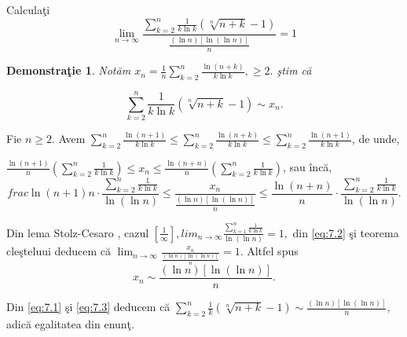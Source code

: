 \documentclass[a4paper,12pt,oneside]{report}
\newtheorem{demonstration}{Demonstra\c tie}
\begin{document}
Calcula\c ti 
\begin{displaymath}
  \lim_{n \to \infty }\frac{\sum_{k=2}^{n}\frac{1}{k \ln k}\left ( \sqrt[n]{n+k}-1 \right )}{\frac{\left ( \ln n \right )\left [ \ln \left ( \ln n  \right ) \right ]}{n}} = 1
\end{displaymath}


\begin{demonstration}
  Not\u am \(x_{n} = \frac{1}{n}\sum_{k=2}^{n}\frac{\ln \left ( n+k \right )}{k \ln k}, \geq 2.\)
\c stim c\u a 

\end{demonstration}
\begin{displaymath}
  \sum_{k=2}^{n}\frac{1}{k\ln k}\left ( \sqrt[n]{n+k}-1 \right )\sim x_{n} . \label{eq:7.1} \tag{7.1}
\end{displaymath}

Fie \(n\geq 2\). Avem \(\sum_{k=2}^{n}\frac{\ln \left ( n+1 \right )}{k\ln k}\leq \sum_{k=2}^{n}\frac{\ln \left ( n+k \right )}{k\ln k}\leq \sum_{k=2}^{n}\frac{\ln \left ( n+1 \right )}{k\ln k}\), de unde,

\(\frac{\ln \left ( n+1 \right )}{n}\left ( \sum_{k=2}^{n}\frac{1}{k\ln k } \right )\leq x_{n}\leq \frac{\ln \left ( n+n \right )}{n}\left ( \sum_{k=2}^{n}\frac{1}{k\ln k } \right )\), sau \^ inc\u a, 
\begin{displaymath}
  frac{\ln \left ( n+1 \right )}{n}\cdot \frac{\sum_{k=2}^{n}\frac{1}{k\ln k }}{\ln \left ( \ln n \right )}\leq \frac{x_{n}}{\frac{\left ( \ln n \right )\left [ \ln\left ( \ln n \right ) \right ]}{n}}\leq \frac{\ln \left ( n+n \right )}{n}\cdot \frac{\sum_{k=2}^{n}\frac{1}{k\ln k }}{\ln \left ( \ln n \right )}. \label{eq:7.2} \tag{7.2}
\end{displaymath}


Din lema Stolz-Cesaro , cazul \(\left [ \frac{1}{\infty } \right ], lim_{n \to \infty }\frac{\sum_{k=1}^{n}\frac{1}{k\ln k}}{\ln\left ( \ln n \right ) } = 1,\) din \ref{eq:7.2} \c si teorema cle\c steluui deducem c\u a \(\lim_{n \to \infty }\frac{x_{n}}{\frac{\left ( \ln n  \right )\left [ \ln\left ( \ln n \right ) \right ]}{n}} = 1\). Altfel spus 
\begin{displaymath}
  x_{n}\sim \frac{\left ( \ln n \right )\left [ \ln\left ( \ln n \right ) \right ]}{n}. \label{eq:7.3} \tag{7.3}
\end{displaymath}

Din \ref{eq:7.1} \c si \ref{eq:7.3} deducem c\u a \(\sum_{k=2}^{n}\frac{1}{k}\left ( \sqrt[n]{n+k}-1 \right )\sim \frac{\left ( \ln n \right )\left [ \ln\left ( \ln n \right ) \right ]}{n}\), adic\u a egalitatea din enun\c t. \cite{dumitru}



\setlength{\baselineskip}{\normalbaselineskip}
\setlength{\parskip}{0pt}

\end{document}

